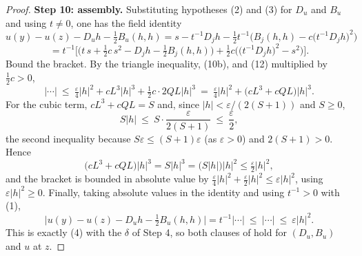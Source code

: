 \begin{proof}
\medskip\noindent\textbf{Step 10: assembly.} Substituting hypotheses (2) and (3) for $D_u$
and $B_u$ and using $t\ne0$, one has the field identity
\[
 u(y)-u(z)-D_uh-\tfrac12B_u(h,h)
  =s-t^{-1}D_jh-\tfrac12t^{-1}\Big(B_j(h,h)-c\big(t^{-1}D_jh\big)^{2}\Big)
\]
\[
 =t^{-1}\Big[\Big(t\,s+\tfrac12c\,s^{2}-D_jh-\tfrac12B_j(h,h)\Big)
   +\tfrac12c\Big(\big(t^{-1}D_jh\big)^{2}-s^{2}\Big)\Big].
\]
Bound the bracket. By the triangle inequality, (10b), and (12) multiplied by
$\frac12c>0$,
\[
 \Big|\cdots\Big|\ \le\ \tfrac\varepsilon4|h|^{2}+cL^{3}|h|^{3}
   +\tfrac12c\cdot2QL|h|^{3}
  \ =\ \tfrac\varepsilon4|h|^{2}+\big(cL^{3}+cQL\big)|h|^{3} .
\]
For the cubic term, $cL^{3}+cQL=S$ and, since $|h|<\varepsilon/(2(S+1))$ and $S\ge0$,
\[
 S|h|\ \le\ S\cdot\frac{\varepsilon}{2(S+1)}\ \le\ \frac\varepsilon2 ,
\]
the second inequality because $S\varepsilon\le(S+1)\varepsilon$ (as $\varepsilon>0$) and
$2(S+1)>0$. Hence
\[
 \big(cL^{3}+cQL\big)|h|^{3}=S|h|^{3}=\big(S|h|\big)|h|^{2}
  \le\tfrac\varepsilon2|h|^{2},
\]
and the bracket is bounded in absolute value by
$\frac\varepsilon4|h|^{2}+\frac\varepsilon2|h|^{2}\le\varepsilon|h|^{2}$, using
$\varepsilon|h|^{2}\ge0$. Finally, taking absolute values in the identity and using
$t^{-1}>0$ with (1),
\[
 \Big|u(y)-u(z)-D_uh-\tfrac12B_u(h,h)\Big|
  =t^{-1}\Big|\cdots\Big|\ \le\ \Big|\cdots\Big|\ \le\ \varepsilon|h|^{2} .
\]
This is exactly (4) with the $\delta$ of Step 4, so both clauses of 
hold for $(D_u,B_u)$ and $u$ at $z$.
\end{proof}
